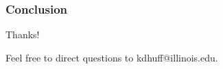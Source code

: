 
\begin{frame}
  \frametitle{Conclusion}
  Thanks!
  
  Feel free to direct questions to kdhuff@illinois.edu.
\end{frame}
